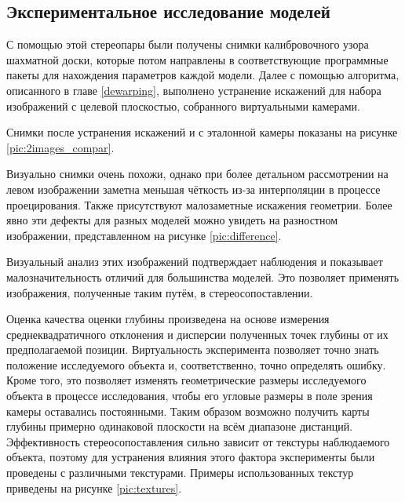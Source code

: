 \subsection{Экспериментальное исследование моделей}
\label{model_exps}

С помощью этой стереопары были получены снимки калибровочного узора шахматной доски, 
которые потом  направлены в соответствующие программные пакеты для нахождения параметров каждой модели. Далее с помощью алгоритма, 
описанного в главе \ref{dewarping},		
выполнено устранение искажений для набора изображений с целевой плоскостью, собранного виртуальными камерами. 

Снимки после устранения искажений и с эталонной камеры показаны на рисунке \ref{pic:2images_compar}.


Визуально снимки очень похожи, однако при более детальном рассмотрении на левом изображении заметна меньшая чёткость
из-за интерполяции в процессе проецирования. Также присутствуют малозаметные искажения геометрии. Более 
явно эти дефекты для разных моделей можно увидеть на разностном изображении, представленном на рисунке \ref{pic:difference}. 


Визуальный анализ этих изображений подтверждает наблюдения и показывает малозначительность отличий для большинства моделей. Это позволяет применять
изображения, полученные таким путём, в стереосопоставлении. 

Оценка качества оценки глубины произведена на основе измерения среднеквадратичного отклонения и дисперсии полученных точек 
глубины от их предполагаемой позиции. Виртуальность эксперимента позволяет точно знать положение исследуемого объекта и, соответственно, 
точно определять ошибку. Кроме того, это позволяет изменять геометрические размеры исследуемого объекта в процессе исследования, чтобы его
угловые размеры в поле зрения камеры оставались постоянными. Таким образом возможно получить карты глубины примерно одинаковой 
плоскости на всём диапазоне дистанций.  Эффективность стереосопоставления \cite{SGBM} сильно зависит от текстуры наблюдаемого объекта, 
поэтому для устранения влияния этого фактора эксперименты были проведены с различными текстурами. 
Примеры использованных текстур приведены на рисунке \ref{pic:textures}. 


